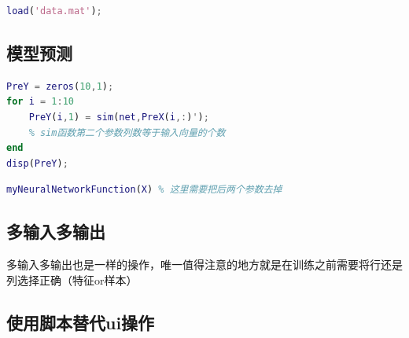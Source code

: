 \documentclass[12pt,a4paper,UTF8]{article}
\begin{document}
\begin{lstlisting}[language=Matlab,caption=从.mat文件中导入数据]
load('data.mat');
\end{lstlisting}

\subsection{模型预测}

\begin{lstlisting}[language=Matlab,caption=方法1：使用sim函数]
PreY = zeros(10,1);
for i = 1:10
    PreY(i,1) = sim(net,PreX(i,:)');
    % sim函数第二个参数列数等于输入向量的个数
end
disp(PreY);
\end{lstlisting}

\begin{lstlisting}[language=Matlab,caption=方法2：使用生成的函数]
myNeuralNetworkFunction(X) % 这里需要把后两个参数去掉
\end{lstlisting}
 
\subsection{多输入多输出}

多输入多输出也是一样的操作，唯一值得注意的地方就是在训练之前需要将行还是列选择正确（特征or样本）

\subsection{使用脚本替代ui操作}
\end{document}
